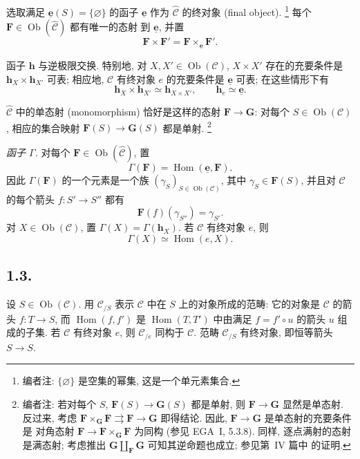 选取满足 \(\underline{\mathbf e}(S)=\{\varnothing\}\) 的函子
\(\underline{\mathbf e}\) 作为 \(\widehat{\mathscr C}\) 的终对象 (final object).
\footnote{编者注: \(\{\varnothing\}\) 是空集的幂集, 这是一个单元素集合.}
每个 \(\mathbf F\in\operatorname{Ob}(\widehat{\mathscr C})\) 都有唯一的态射
到 \(\underline{\mathbf e}\), 并置
\[
  \mathbf F\times\mathbf F'
    =\mathbf F\mathbin{\times_{\underline{\mathbf e}}}\mathbf F'.
\]

函子 \(\mathbf h\) 与逆极限交换. 特别地, 对
\(X,X'\in\operatorname{Ob}(\mathscr C)\),
\(X\times X'\) 存在的充要条件是 \(\mathbf h_X\times\mathbf h_{X'}\) 可表;
相应地, \(\mathscr C\) 有终对象 \(e\) 的充要条件是 \(\underline{\mathbf e}\) 可表;
在这些情形下有
\[
  \mathbf h_X\times\mathbf h_{X'}\simeq\mathbf h_{X\times X'},
  \qquad
  \mathbf h_e\simeq\underline{\mathbf e}.
\]

\(\widehat{\mathscr C}\) 中的单态射 (monomorphism) 恰好是这样的态射
\(\mathbf F\to\mathbf G\): 对每个 \(S\in\operatorname{Ob}(\mathscr C)\),
相应的集合映射 \(\mathbf F(S)\to\mathbf G(S)\) 都是单射.
\footnote{编者注: 若对每个 \(S\), \(\mathbf F(S)\to\mathbf G(S)\) 都是单射,
则 \(\mathbf F\to\mathbf G\) 显然是单态射.
反过来, 考虑
\(\mathbf F\times_{\mathbf G}\mathbf F\rightrightarrows\mathbf F\to
\mathbf G\) 即得结论. 因此, \(\mathbf F\to\mathbf G\) 是单态射的充要条件是
对角态射 \(\mathbf F\to\mathbf F\times_{\mathbf G}\mathbf F\) 为同构
(参见 EGA~I, 5.3.8). 同样, 逐点满射的态射是满态射; 考虑推出
\(\mathbf G\amalg_{\mathbf F}\mathbf G\) 可知其逆命题也成立;
参见第~IV 篇中 的证明.}

\medskip
\noindent\textit{函子 \(\Gamma\).}
对每个 \(\mathbf F\in\operatorname{Ob}(\widehat{\mathscr C})\), 置
\[
  \Gamma(\mathbf F)=\operatorname{Hom}
    (\underline{\mathbf e},\mathbf F).
\]
因此 \(\Gamma(\mathbf F)\) 的一个元素是一个族
\((\gamma_S)_{S\in\operatorname{Ob}(\mathscr C)}\), 其中
\(\gamma_S\in\mathbf F(S)\), 并且对 \(\mathscr C\) 的每个箭头
\(f:S'\to S''\) 都有
\[
  \mathbf F(f)(\gamma_{S''})=\gamma_{S'}.
\]
对 \(X\in\operatorname{Ob}(\mathscr C)\), 置
\(\Gamma(X)=\Gamma(\mathbf h_X)\). 若 \(\mathscr C\) 有终对象 \(e\), 则
\[
  \Gamma(X)\simeq\operatorname{Hom}(e,X).
\]

\subsection*{1.3.}

设 \(S\in\operatorname{Ob}(\mathscr C)\).
用 \(\mathscr C_{/S}\) 表示 \(\mathscr C\) 中在 \(S\) 上的对象所成的范畴:
它的对象是 \(\mathscr C\) 的箭头 \(f:T\to S\),
而 \(\operatorname{Hom}(f,f')\) 是 \(\operatorname{Hom}(T,T')\) 中由满足
\(f=f'\circ u\) 的箭头 \(u\) 组成的子集.
若 \(\mathscr C\) 有终对象 \(e\), 则 \(\mathscr C_{/e}\) 同构于 \(\mathscr C\).
范畴 \(\mathscr C_{/S}\) 有终对象, 即恒等箭头 \(S\to S\).

